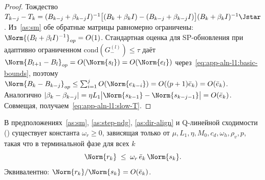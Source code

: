 \begin{proof}
Тождество
$T_{k-j} - T_k = (B_{k-j}+\beta_{k-j}I)^{-1}\bigl[(B_k+\beta_k I)
- (B_{k-j}+\beta_{k-j}I)\bigr](B_k+\beta_k I)^{-1}\Jstar$.
Из~\ref{as:sm} обе обратные матрицы равномерно ограничены:
$\Norm{(B_{l}+\beta_{l}I)^{-1}}_{op} = O(1)$. Стандартная оценка для
SP-обновления при адаптивно ограниченном
$\mathrm{cond}(G_-^{(l)})\le\tau$ даёт
$\Norm{B_{l+1}-B_{l}}_{op} = O(\Norm{s_{l}}) = O(\Norm{e_{l}})$
через~\eqref{eq:app-aln-l1:basic-bounds}, поэтому
$\Norm{B_k - B_{k-j}}_{op} \le \sum_{i=1}^{j}O(\Norm{e_{k-i}})
= O((p+1)\bar e_k) = O(\bar e_k)$. Аналогично
$|\beta_k - \beta_{k-j}| = \eta L_1\bigl|\Norm{s_{k-1}}
- \Norm{s_{k-j-1}}\bigr| = O(\bar e_k)$. Совмещая,
получаем~\eqref{eq:app-aln-l1:slow-T}.
\end{proof}

\begin{lemma}
\label{lem:app-aln-l1:secant-rk}
В предположениях~\ref{as:sm}, \ref{as:step-ndg}, \ref{as:dir-align} и
Q-линейной сходимости \textup{(}\cite[Theorem~3.4]{Agafonov2024VIJI}\textup{)}
существует константа $\omega_r \ge 0$, зависящая только от
$\mu, L_1, \eta, M_{0}, c_d, \omega_h, \rho_v, p$, такая что в
терминальной фазе для всех $k$
\begin{equation}
\Norm{r_k} \;\le\; \omega_{r}\,\bar e_k\,\Norm{s_k}.
\label{eq:app-aln-l1:secant-rk}
\end{equation}
Эквивалентно: $\Norm{r_k}/\Norm{s_k} = O(\bar e_k)$.
\end{lemma}

